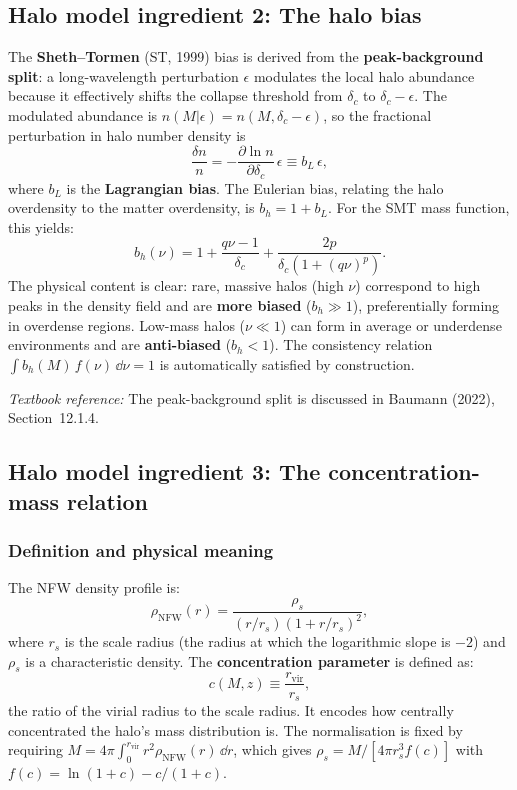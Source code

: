 \documentclass[10pt,a4paper]{article}
\begin{document}
\subsection{Halo model ingredient 2: The halo bias}
\label{sec:bias}

The \textbf{Sheth--Tormen} (ST, 1999) bias is derived from the \textbf{peak-background split}: a long-wavelength perturbation $\epsilon$ modulates the local halo abundance because it effectively shifts the collapse threshold from $\delta_c$ to $\delta_c - \epsilon$. The modulated abundance is $n(M | \epsilon) = n(M, \delta_c - \epsilon)$, so the fractional perturbation in halo number density is
\begin{equation}
\frac{\delta n}{n} = -\frac{\partial \ln n}{\partial \delta_c} \, \epsilon \equiv b_L \, \epsilon,
\end{equation}
where $b_L$ is the \textbf{Lagrangian bias}. The Eulerian bias, relating the halo overdensity to the matter overdensity, is $b_h = 1 + b_L$. For the SMT mass function, this yields:
\begin{equation}
\label{eq:ST_bias}
b_h(\nu) = 1 + \frac{q\nu - 1}{\delta_c} + \frac{2p}{\delta_c \left(1 + (q\nu)^p\right)}.
\end{equation}
The physical content is clear: rare, massive halos (high $\nu$) correspond to high peaks in the density field and are \textbf{more biased} ($b_h \gg 1$), preferentially forming in overdense regions. Low-mass halos ($\nu \ll 1$) can form in average or underdense environments and are \textbf{anti-biased} ($b_h < 1$). The consistency relation $\int b_h(M) \, f(\nu) \, \dd\nu = 1$ is automatically satisfied by construction.

\textit{Textbook reference:} The peak-background split is discussed in Baumann (2022), Section~12.1.4.

\subsection{Halo model ingredient 3: The concentration-mass relation}
\label{sec:concentration}

\subsubsection{Definition and physical meaning}

The NFW density profile is:
\begin{equation}
\label{eq:NFW}
\rho_{\mathrm{NFW}}(r) = \frac{\rho_s}{(r/r_s)(1 + r/r_s)^2},
\end{equation}
where $r_s$ is the scale radius (the radius at which the logarithmic slope is $-2$) and $\rho_s$ is a characteristic density. The \textbf{concentration parameter} is defined as:
\begin{equation}
c(M, z) \equiv \frac{r_{\mathrm{vir}}}{r_s},
\end{equation}
the ratio of the virial radius to the scale radius. It encodes how centrally concentrated the halo's mass distribution is. The normalisation is fixed by requiring $M = 4\pi \int_0^{r_{\mathrm{vir}}} r^2 \rho_{\mathrm{NFW}}(r) \, \dd r$, which gives $\rho_s = M / [4\pi r_s^3 f(c)]$ with $f(c) = \ln(1 + c) - c/(1 + c)$.
\end{document}
